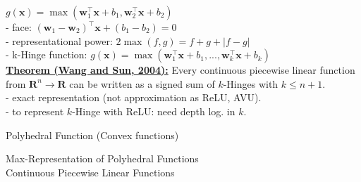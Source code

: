 \documentclass[10pt,landscape]{article}
\begin{document}
\begin{multicols*}{3}
{\begin{minipage}{\linewidth}
$g(\mathbf{x})=\max(\mathbf{w}_1^\top \mathbf{x} + b_1, \mathbf{w}_2^\top \mathbf{x} + b_2)$\\
- face: $(\mathbf{w}_1-\mathbf{w}_2)^\top\mathbf{x}+(b_1-b_2)=0$\\
- representational power: $2\max(f,g)=f+g+|f-g|$\\
- k-Hinge function: $g(\mathbf{x})=\max(\mathbf{w}_1^\top \mathbf{x} + b_1,...,\mathbf{w}_k^\top \mathbf{x} + b_k)$ \\
\underline{\textbf{Theorem (Wang and Sun, 2004):}} Every continuous piecewise linear function from $\mathbf{R}^n\rightarrow\mathbf{R}$ can be written as a signed sum of $k$-Hinges with $k\leq n+1$. \\
- exact representation (not approximation as ReLU, AVU). \\
- to represent $k$-Hinge with ReLU: need depth log. in $k$.
\end{minipage}}
\begin{minipage}{\linewidth}
{Polyhedral Function (Convex functions)} \\
\end{minipage}
{Max-Representation of Polyhedral Functions} \\
{ Continuous Piecewise Linear Functions} \\

\end{multicols*}
\end{document}
